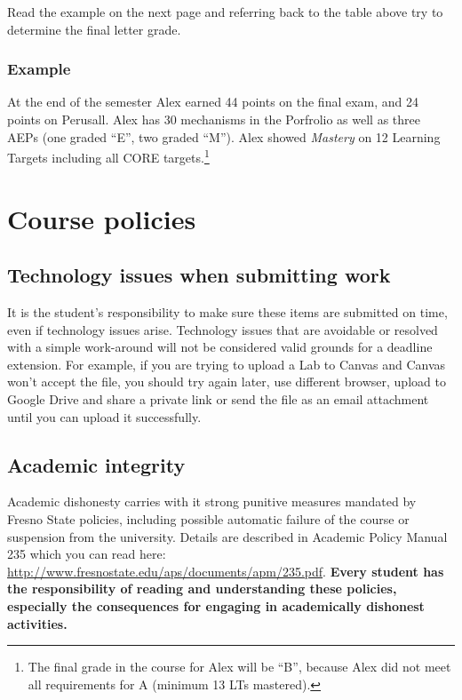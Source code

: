 Read the example on the next page and referring back to the table above
try to determine the final letter grade.

\clearpage

\hypertarget{example}{%
\subsubsection{Example}\label{example}}

At the end of the semester Alex earned 44 points on the final exam, and
24 points on Perusall. Alex has 30 mechanisms in the Porfrolio as well
as three AEPs (one graded ``E'', two graded ``M''). Alex showed
\emph{Mastery} on 12 Learning Targets including all CORE
targets.\footnote{The final grade in the course for Alex will be ``B'',
  because Alex did not meet all requirements for A (minimum 13 LTs
  mastered).}

\hypertarget{course-policies}{%
\section{Course policies}\label{course-policies}}

\hypertarget{technology-issues-when-submitting-work}{%
\subsection{Technology issues when submitting
work}\label{technology-issues-when-submitting-work}}

It is the student's responsibility to make sure these items are
submitted on time, even if technology issues arise. Technology issues
that are avoidable or resolved with a simple work-around will not be
considered valid grounds for a deadline extension. For example, if you
are trying to upload a Lab to Canvas and Canvas won't accept the file,
you should try again later, use different browser, upload to Google
Drive and share a private link or send the file as an email attachment
until you can upload it successfully.

\hypertarget{academic-integrity}{%
\subsection{Academic integrity}\label{academic-integrity}}

Academic dishonesty carries with it strong punitive measures mandated by
Fresno State policies, including possible automatic failure of the
course or suspension from the university. Details are described in
Academic Policy Manual 235 which you can read here:
\url{http://www.fresnostate.edu/aps/documents/apm/235.pdf}.
\textbf{Every student has the responsibility of reading and
understanding these policies, especially the consequences for engaging
in academically dishonest activities.}

